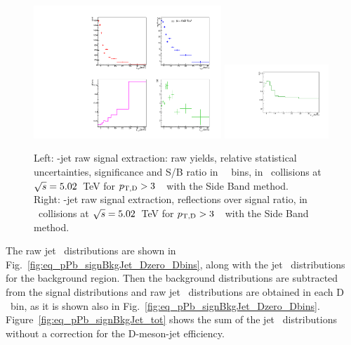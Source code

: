 \begin{figure}[bth]
\centering
\includegraphics[width=0.63\textwidth]{pPbcuts_2sig/signalParams_pTD3}
\includegraphics[width=0.35\textwidth]{pPbcuts_2sig/RefOverS_pTD3}
\caption{Left: \Dzero-jet raw signal extraction: raw yields, relative statistical uncertainties, significance and S/B ratio in \Dzero\ \pt\ bins, in \pp\ collisions at $\sqrt{s}=5.02$~TeV for $p_{\mathrm{T,D}}>3$~\GeVc\ with the Side Band method.
\\Right: \Dzero-jet raw signal extraction, reflections over signal ratio, in \pp\ collisions at $\sqrt{s}=5.02$~TeV for $p_{\mathrm{T,D}}>3$~\GeVc\ with the Side Band method.}
\label{fig:eq_pPb_RSU_raw_Dbins_Dzero}
\end{figure}

The raw jet \pt\ distributions are shown in Fig.~\ref{fig:eq_pPb_signBkgJet_Dzero_Dbins}, along with the jet \pt\ distributions for the background region. 
Then the background distributions are subtracted from the signal distributions and raw jet \pt\ distributions are obtained in each D \pt\ bin, 
as it is shown also in Fig.~\ref{fig:eq_pPb_signBkgJet_Dzero_Dbins}.
Figure~\ref{fig:eq_pPb_signBkgJet_tot} shows the sum of the jet \pt\ distributions without a correction for the D-meson-jet efficiency.

